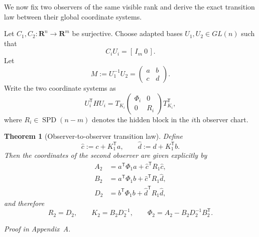 \documentclass[11pt,a4paper]{article}
\numberwithin{equation}{section}
\DeclareMathOperator{\SPD}{SPD}
\newcommand{\R}{\mathbf R}
\theoremstyle{thmcompact}
\newtheorem{theorem}{Theorem}[section]
\theoremstyle{remark}
\newcommand{\proofappendix}{\par{\hfill\scriptsize\emph{Proof in Appendix~A.}}\par}
\begin{document}
We now fix two observers of the same visible rank and derive the exact transition law between their global coordinate systems.

Let $C_1,C_2:\R^n\to\R^m$ be surjective. Choose adapted bases $U_1,U_2\in GL(n)$ such that
\begin{equation}
C_iU_i=[\,I_m\ 0\,].
\label{eq:two-adapted-bases}
\end{equation}
Let
\begin{equation}
M:=U_1^{-1}U_2=
\begin{pmatrix}
a & b\\
c & d
\end{pmatrix}.
\label{eq:M-block}
\end{equation}
Write the two coordinate systems as
\begin{equation}
U_i^{\mathsf T}HU_i = T_{K_i}
\begin{pmatrix}
\Phi_i & 0\\
0 & R_i
\end{pmatrix}
T_{K_i}^{\mathsf T},
\label{eq:two-coordinates}
\end{equation}
where $R_i\in\SPD(n-m)$ denotes the hidden block in the $i$th observer chart.

\begin{theorem}[Observer-to-observer transition law]
\label{thm:transition-law}
Define
\begin{equation}
\widehat c:=c+K_1^{\mathsf T}a,
\qquad
\widehat d:=d+K_1^{\mathsf T}b.
\label{eq:c-hat-d-hat}
\end{equation}
Then the coordinates of the second observer are given explicitly by
\begin{align}
A_2 &= a^{\mathsf T}\Phi_1 a + \widehat c^{\mathsf T}R_1\widehat c,
\label{eq:A2}\\
B_2 &= a^{\mathsf T}\Phi_1 b + \widehat c^{\mathsf T}R_1\widehat d,
\label{eq:B2}\\
D_2 &= b^{\mathsf T}\Phi_1 b + \widehat d^{\mathsf T}R_1\widehat d,
\label{eq:D2}
\end{align}
and therefore
\begin{equation}
R_2=D_2,
\qquad
K_2=B_2D_2^{-1},
\qquad
\Phi_2=A_2-B_2D_2^{-1}B_2^{\mathsf T}.
\label{eq:transition-final}
\end{equation}
\end{theorem}

\proofappendix
\end{document}
